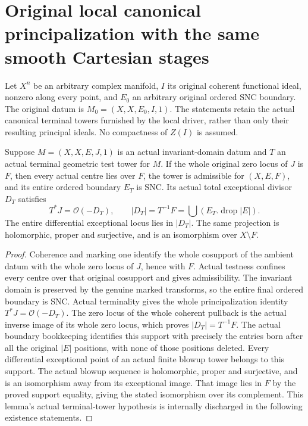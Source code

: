 \section{Original local canonical principalization with the same smooth Cartesian stages}

Let $X^n$ be an arbitrary complex manifold, $I$ its original coherent
functional ideal, nonzero along every point, and $E_0$ an arbitrary
original ordered SNC boundary. The original datum is
$M_0=(X,X,E_0,I,1)$. The statements retain the actual canonical terminal
towers furnished by the local driver, rather than only their resulting
principal ideals. No compactness of $Z(I)$ is assumed.

\begin{lemma}
\label{hir:original-local-canonical-principalization-terminal-geometry}
\leanok
Suppose $M=(X,X,E,J,1)$ is an actual invariant-domain datum and $T$ an
actual terminal geometric test tower for $M$. If the whole original zero
locus of $J$ is $F$, then every actual centre lies over $F$, the tower
is admissible for $(X,E,F)$, and its entire ordered boundary $E_T$ is SNC.
Its actual total exceptional divisor $D_T$ satisfies
\[
 T^*J=\mathcal O(-D_T),\qquad
 |D_T|=T^{-1}F=\bigcup(E_T.\operatorname{drop}|E|).
\]
The entire differential exceptional locus lies in $|D_T|$. The same
projection is holomorphic, proper and surjective, and is an isomorphism
over $X\setminus F$.
\end{lemma}
\begin{proof}
Coherence and marking one identify the whole cosupport of the ambient
datum with the whole zero locus of $J$, hence with $F$. Actual testness
confines every centre over that original cosupport and gives admissibility.
The invariant domain is preserved by the genuine marked transforms, so
the entire final ordered boundary is SNC. Actual terminality gives the
whole principalization identity $T^*J=\mathcal O(-D_T)$. The zero locus
of the whole coherent pullback is the actual inverse image of its whole
zero locus, which proves $|D_T|=T^{-1}F$. The actual boundary bookkeeping
identifies this support with precisely the entries born after all the
original $|E|$ positions, with none of those positions deleted. Every
differential exceptional point of an actual finite blowup tower belongs
to this support. The actual blowup sequence is holomorphic, proper and
surjective, and is an isomorphism away from its exceptional image. That
image lies in $F$ by the proved support equality, giving the stated
isomorphism over its complement. This lemma's actual terminal-tower
hypothesis is internally discharged in the following existence statements.
\end{proof}

